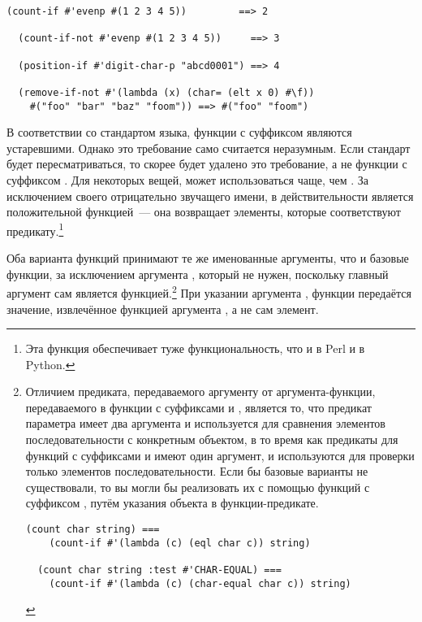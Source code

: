 \begin{lstlisting}[style=lisprepl]
  (count-if #'evenp #(1 2 3 4 5))         ==> 2

  (count-if-not #'evenp #(1 2 3 4 5))     ==> 3

  (position-if #'digit-char-p "abcd0001") ==> 4

  (remove-if-not #'(lambda (x) (char= (elt x 0) #\f))
    #("foo" "bar" "baz" "foom")) ==> #("foo" "foom")
\end{lstlisting}

В соответствии со стандартом языка, функции с суффиксом  являются
устаревшими.  Однако это требование само считается неразумным.  Если стандарт будет
пересматриваться, то скорее будет удалено это требование, а не функции с суффиксом
.  Для некоторых вещей,  может использоваться чаще, чем
.  За исключением своего отрицательно звучащего имени, в действительности
 является положительной функцией~--- она возвращает элементы, которые
соответствуют предикату.\footnote{Эта функция обеспечивает туже функциональность, что и
   в Perl и  в Python.}

Оба варианта функций принимают те же именованные аргументы, что и базовые функции, за
исключением аргумента , который не нужен, поскольку главный аргумент сам
является функцией.\footnote{Отличием предиката, передаваемого аргументу  от
  аргумента-функции, передаваемого в функции с суффиксами  и ,
  является то, что предикат параметра  имеет два аргумента и используется для
  сравнения элементов последовательности с конкретным объектом, в то время как предикаты
  для функций с суффиксами  и  имеют один аргумент, и используются
  для проверки только элементов последовательности.  Если бы базовые варианты не
  существовали, то вы могли бы реализовать их с помощью функций с суффиксом ,
  путём указания объекта в функции-предикате.

\begin{lstlisting}[style=lisprepl]
  (count char string) ===
    (count-if #'(lambda (c) (eql char c)) string)
  
  (count char string :test #'CHAR-EQUAL) ===
    (count-if #'(lambda (c) (char-equal char c)) string)
\end{lstlisting}

}  При указании аргумента , функции передаётся значение, извлечённое функцией
аргумента , а не сам элемент.

